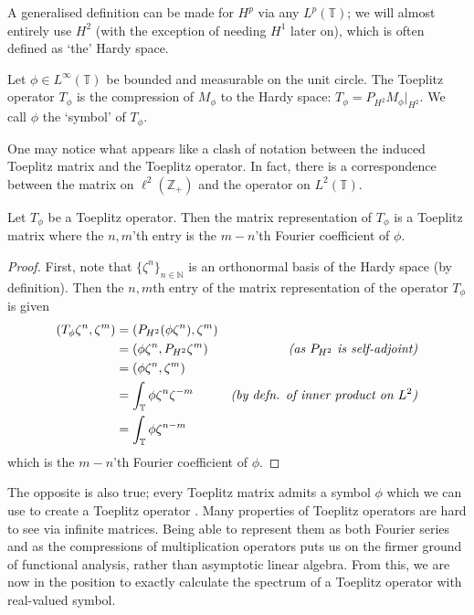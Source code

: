 \documentclass[../main.tex]{subfiles}
\begin{document}
A generalised definition can be made for $H^p$ via any $L^p(\mathbb{T})$; we
will almost entirely use $H^2$ (with the exception of needing $H^1$ later on),
which is often defined as `the' Hardy space.

\begin{definition}
  Let $\phi \in L^{\infty}(\mathbb{T})$ be bounded and measurable on the unit
  circle. The Toeplitz operator $T_\phi$ is the compression of $M_\phi$ to
  the Hardy space: $T_{\phi} = P_{H^2} M_\phi \big|_{H^2}$. We call $\phi$
  the `symbol' of $T_\phi$.
\end{definition}

One may notice what appears like a clash of notation between the induced
Toeplitz matrix and the Toeplitz operator. In fact, there is a correspondence
between the matrix on $\ell^2(\mathbb{Z}_+)$ and the operator on $L^2(\mathbb{T})$.

\begin{theorem}
  Let $T_\phi$ be a Toeplitz operator. Then the matrix representation of $T_\phi$
  is a Toeplitz matrix where the $n,m$'th entry is the $m-n$'th Fourier coefficient
  of $\phi$.
\end{theorem}
\begin{proof}\cite{garcia2023operator}
First, note that $\{\zeta^n\}_{n\in\mathbb{N}}$ is an orthonormal basis of
the Hardy space (by definition).
Then the $n,m$th entry of the matrix representation of the operator $T_\phi$ is given
  \begin{align*}
    (T_{\phi}\zeta^n, \zeta^m) & = (P_{H^2}(\phi\zeta^n), \zeta^m) & \\
                               & = (\phi\zeta^n, P_{H^2}\zeta^m) 
                                 & \text{\emph{(as $P_{H^2}$ is self-adjoint)}} \\
                               & = (\phi\zeta^n, \zeta^m) &\\
                               & = \int_{\mathbb{T}} \phi\zeta^n \zeta^{-m}
                                 & \text{\emph{(by defn. of inner product on $L^2$)}}\\
                               & = \int_{\mathbb{T}} \phi \zeta^{n-m} &\\
  \end{align*}
which is the $m-n$'th Fourier coefficient of $\phi$.
\end{proof}
The opposite is also true; every Toeplitz matrix admits a symbol $\phi$ which
we can use to create a Toeplitz operator \cite{garcia2023operator}.
Many properties of Toeplitz operators are hard to see via infinite matrices.
Being able to represent them as both Fourier series and as the  compressions of
multiplication operators puts us on the firmer ground of functional analysis,
rather than asymptotic linear algebra. From this, we
are now in the position to exactly calculate the spectrum of a Toeplitz operator
with real-valued symbol.
\end{document}

